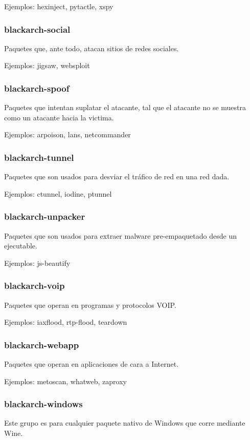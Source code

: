 \documentclass[a4paper, oneside, 11pt]{book}
\begin{document}
Ejemplos: hexinject, pytactle, xspy

\subsubsection{blackarch-social}
Paquetes que, ante todo, atacan sitios de redes sociales.

Ejemplos: jigsaw, websploit

\subsubsection{blackarch-spoof}
Paquetes que intentan suplatar el atacante, tal que el atacante
no se muestra como un atacante hacia la victima.

Ejemplos: arpoison, lans, netcommander

\subsubsection{blackarch-tunnel}
Paquetes que son usados para desviar el tráfico de red
en una red dada.

Ejemplos: ctunnel, iodine, ptunnel

\subsubsection{blackarch-unpacker}
Paquetes que son usados para extraer malware pre-empaquetado desde un
ejecutable.

Ejemplos: js-beautify

\subsubsection{blackarch-voip}
Paquetes que operan en programas y protocolos VOIP.

Ejemplos: iaxflood, rtp-flood, teardown

\subsubsection{blackarch-webapp}
Paquetes que operan en aplicaciones de cara a Internet.

Ejemplos: metoscan, whatweb, zaproxy

\subsubsection{blackarch-windows}
Este grupo es para cualquier paquete nativo de Windows que corre mediante Wine.
\end{document}
